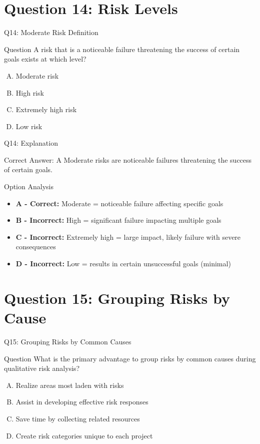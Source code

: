 \documentclass{beamer}
\begin{document}
	\section{Question 14: Risk Levels}
	
	\begin{frame}{Q14: Moderate Risk Definition}
		\begin{block}{Question}
			A risk that is a noticeable failure threatening the success of certain goals exists at which level?
		\end{block}
		\begin{enumerate}[(A)]
			\item Moderate risk
			\item High risk
			\item Extremely high risk
			\item Low risk
		\end{enumerate}
	\end{frame}
	
	\begin{frame}{Q14: Explanation}
		\begin{block}{Correct Answer: A}
			Moderate risks are noticeable failures threatening the success of certain goals.
		\end{block}
		\begin{block}{Option Analysis}
			\begin{itemize}
				\item \textbf{A - Correct:} Moderate = noticeable failure affecting specific goals
				\item \textbf{B - Incorrect:} High = significant failure impacting multiple goals
				\item \textbf{C - Incorrect:} Extremely high = large impact, likely failure with severe consequences
				\item \textbf{D - Incorrect:} Low = results in certain unsuccessful goals (minimal)
			\end{itemize}
		\end{block}
	\end{frame}
	
	\section{Question 15: Grouping Risks by Cause}
	
	\begin{frame}{Q15: Grouping Risks by Common Causes}
		\begin{block}{Question}
			What is the primary advantage to group risks by common causes during qualitative risk analysis?
		\end{block}
		\begin{enumerate}[(A)]
			\item Realize areas most laden with risks
			\item Assist in developing effective risk responses
			\item Save time by collecting related resources
			\item Create risk categories unique to each project
		\end{enumerate}
	\end{frame}
	
\end{document}
